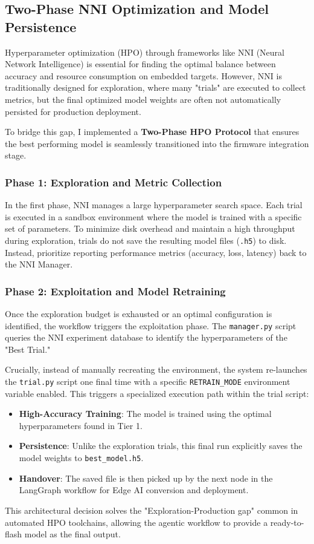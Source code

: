 \subsection{Two-Phase NNI Optimization and Model Persistence}

Hyperparameter optimization (HPO) through frameworks like NNI (Neural Network Intelligence) is essential for finding the optimal balance between accuracy and resource consumption on embedded targets. However, NNI is traditionally designed for exploration, where many "trials" are executed to collect metrics, but the final optimized model weights are often not automatically persisted for production deployment.

To bridge this gap, I implemented a \textbf{Two-Phase HPO Protocol} that ensures the best performing model is seamlessly transitioned into the firmware integration stage.

\subsubsection{Phase 1: Exploration and Metric Collection}

In the first phase, NNI manages a large hyperparameter search space. Each trial is executed in a sandbox environment where the model is trained with a specific set of parameters. To minimize disk overhead and maintain a high throughput during exploration, trials do not save the resulting model files (\texttt{.h5}) to disk. Instead, prioritize reporting performance metrics (accuracy, loss, latency) back to the NNI Manager.

\subsubsection{Phase 2: Exploitation and Model Retraining}

Once the exploration budget is exhausted or an optimal configuration is identified, the workflow triggers the exploitation phase. The \texttt{manager.py} script queries the NNI experiment database to identify the hyperparameters of the "Best Trial."

Crucially, instead of manually recreating the environment, the system re-launches the \texttt{trial.py} script one final time with a specific \texttt{RETRAIN\_MODE} environment variable enabled. This triggers a specialized execution path within the trial script:

\begin{itemize}
    \item \textbf{High-Accuracy Training}: The model is trained using the optimal hyperparameters found in Tier 1.
    \item \textbf{Persistence}: Unlike the exploration trials, this final run explicitly saves the model weights to \texttt{best\_model.h5}.
    \item \textbf{Handover}: The saved file is then picked up by the next node in the LangGraph workflow for Edge AI conversion and deployment.
\end{itemize}

This architectural decision solves the "Exploration-Production gap" common in automated HPO toolchains, allowing the agentic workflow to provide a ready-to-flash model as the final output.
